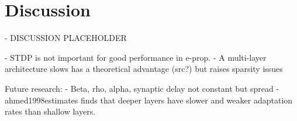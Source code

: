 \chapter{Discussion}\label{ch:discussion}


\begin{tcolorbox}[colback=orange]
- DISCUSSION PLACEHOLDER

- STDP is not important for good performance in e-prop.
- A multi-layer architecture slows has a theoretical advantage (src?) but raises sparsity issues
\end{tcolorbox}


\begin{tcolorbox}[colback=orange]
Future research:
- Beta, rho, alpha, synaptic delay not constant but spread
- ahmed1998estimates finds that deeper layers have slower and weaker adaptation rates than shallow layers.
\end{tcolorbox}
